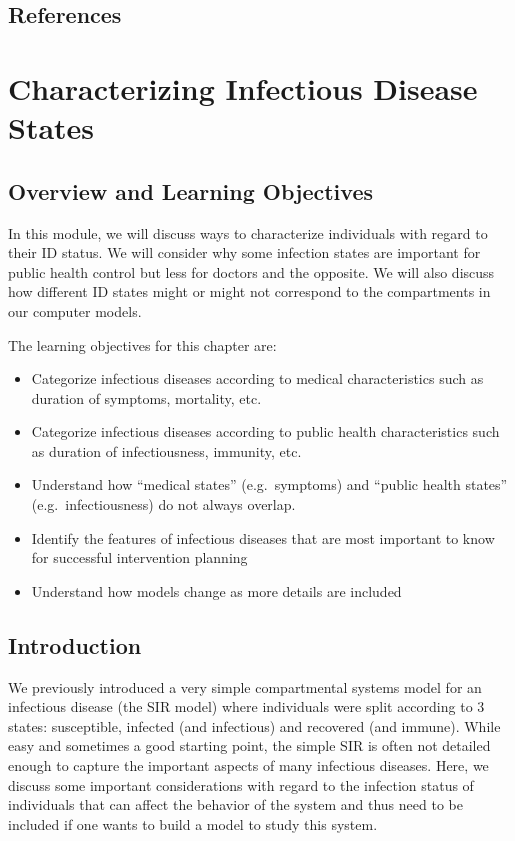 \documentclass[]{article}
\providecommand{\tightlist}{%
  \setlength{\itemsep}{0pt}\setlength{\parskip}{0pt}}
\theoremstyle{definition}
\theoremstyle{definition}
\theoremstyle{definition}
\theoremstyle{remark}
\begin{document}
\subsection{References}\label{references-1}

\section{Characterizing Infectious Disease
States}\label{characterizing-infectious-disease-states}

\subsection{Overview and Learning
Objectives}\label{overview-and-learning-objectives-1}

In this module, we will discuss ways to characterize individuals with
regard to their ID status. We will consider why some infection states
are important for public health control but less for doctors and the
opposite. We will also discuss how different ID states might or might
not correspond to the compartments in our computer models.

The learning objectives for this chapter are:

\begin{itemize}
\tightlist
\item
  Categorize infectious diseases according to medical characteristics
  such as duration of symptoms, mortality, etc.
\item
  Categorize infectious diseases according to public health
  characteristics such as duration of infectiousness, immunity, etc.
\item
  Understand how ``medical states'' (e.g.~symptoms) and ``public health
  states'' (e.g.~infectiousness) do not always overlap.
\item
  Identify the features of infectious diseases that are most important
  to know for successful intervention planning
\item
  Understand how models change as more details are included
\end{itemize}

\subsection{Introduction}\label{introduction-1}

We previously introduced a very simple compartmental systems model for
an infectious disease (the SIR model) where individuals were split
according to 3 states: susceptible, infected (and infectious) and
recovered (and immune). While easy and sometimes a good starting point,
the simple SIR is often not detailed enough to capture the important
aspects of many infectious diseases. Here, we discuss some important
considerations with regard to the infection status of individuals that
can affect the behavior of the system and thus need to be included if
one wants to build a model to study this system.
\end{document}
